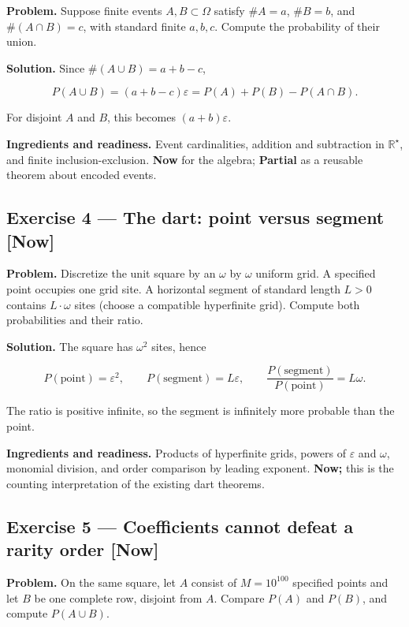 \documentclass[11pt]{article}
\newcommand{\Rstar}{\mathbb{R}^{\star}}
\newcommand{\eps}{\varepsilon}
\renewcommand{\epsilon}{\varepsilon}
\begin{document}
\textbf{Problem.} Suppose finite events $A,B\subset \Omega$ satisfy $\#A = a$,
$\#B = b$, and $\#(A\cap B) = c$, with standard finite $a,b,c$. Compute
the probability of their union.

\textbf{Solution.} Since $\#(A\cup B) = a + b - c$,

\[
P(A\cup B)=(a+b-c)\epsilon
=P(A)+P(B)-P(A\cap B).
\]

For disjoint $A$ and $B$, this becomes $(a+b)\eps$.

\textbf{Ingredients and readiness.} Event cardinalities, addition and subtraction
in $\Rstar$, and finite inclusion-exclusion. \textbf{Now} for the algebra; \textbf{Partial}
as a reusable theorem about encoded events.


\subsection*{Exercise 4 --- The dart: point versus segment \hfill \normalfont\small[Now]}

\textbf{Problem.} Discretize the unit square by an $\omega$ by $\omega$ uniform grid.
A specified point occupies one grid site. A horizontal segment of standard
length $L > 0$ contains $L\cdot \omega$ sites (choose a compatible hyperfinite grid).
Compute both probabilities and their ratio.

\textbf{Solution.} The square has $\omega^2$ sites, hence

\[
P(\text{point})=\epsilon^2,
\qquad
P(\text{segment})=L\epsilon,
\qquad
\frac{P(\text{segment})}{P(\text{point})}=L\omega.
\]

The ratio is positive infinite, so the segment is infinitely more probable
than the point.

\textbf{Ingredients and readiness.} Products of hyperfinite grids, powers of
$\eps$ and $\omega$, monomial division, and order comparison by leading
exponent. \textbf{Now;} this is the counting interpretation of the existing dart
theorems.


\subsection*{Exercise 5 --- Coefficients cannot defeat a rarity order \hfill \normalfont\small[Now]}

\textbf{Problem.} On the same square, let $A$ consist of $M = 10^{100}$ specified
points and let $B$ be one complete row, disjoint from $A$. Compare $P(A)$ and
$P(B)$, and compute $P(A\cup B)$.
\end{document}

